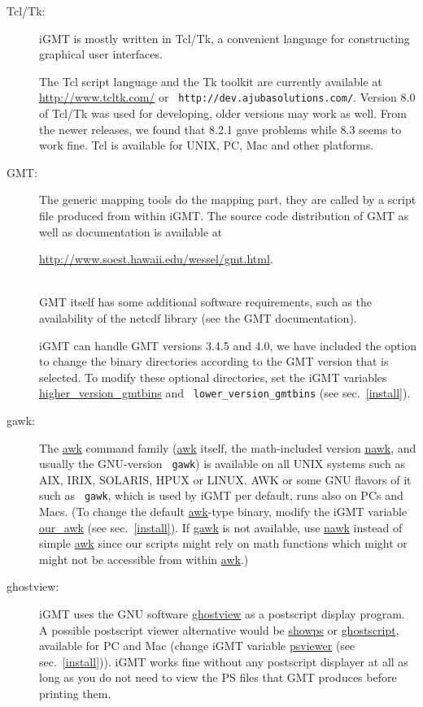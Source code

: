 \documentclass[11pt]{article}
\begin{document}
\begin{description}

\item[Tcl/Tk:] iGMT is mostly written in Tcl/Tk, a
  convenient language for constructing graphical user interfaces.
  
  The Tcl script language and the Tk toolkit \citep{ousterhout} are
  currently available at
  \url{http://www.tcltk.com/} or {\tt
    http://dev.ajubasolutions.com/}. Version 8.0 of Tcl/Tk was used for
  developing, older versions may work as well. From the newer releases,
  we found that 8.2.1 gave problems while 8.3 seems to work fine.
  Tcl is available for UNIX, PC, Mac and other platforms.

\item[GMT:] The generic mapping tools \citep{gmt,wessel95,wessel98} do the
  mapping part, they are called by a script file produced from within iGMT. 
  The source code distribution of GMT as well as documentation
  is available at\\
  \centerline{\url{http://www.soest.hawaii.edu/wessel/gmt.html}.}\\
  GMT itself has
  some additional software requirements, such as the availability of the netcdf library
  (see the GMT documentation). 

  
  iGMT can handle GMT versions 3.4.5 and 4.0, we have included the
  option to change the binary directories according to the GMT version
  that is selected. To modify these optional directories, set the iGMT
  variables \url{higher_version_gmtbins} and {\tt
    lower\_version\_gmtbins} (see sec.~\ref{install}).

  
  
\item[gawk:] The \url{awk} command family (\url{awk} itself, the
  math-included version \url{nawk}, and usually the GNU-version {\tt
    gawk}) is available on all UNIX systems such as AIX, IRIX,
  SOLARIS, HPUX or LINUX. AWK or some GNU flavors of it such as {\tt
    gawk}, which is used by iGMT per default,  runs also on PCs and
  Macs. (To change the default \url{awk}-type binary, modify the iGMT
  variable \url{our_awk} (see sec.~\ref{install}).  If \url{gawk} is
  not available, use
  \url{nawk} instead of simple \url{awk} since our scripts might
  rely on math functions which might or might not be accessible from
  within \url{awk}.)
 

  
\item[ghostview:] iGMT uses the GNU software \url{ghostview} as a
  postscript display program.  A possible postscript viewer
  alternative would be \url{showps} or \url{ghostscript}, available
  for PC and Mac (change iGMT variable \url{psviewer} (see
  sec.~\ref{install})).  iGMT works fine without any postscript
  displayer at all as long as you do not need to view the PS files
  that GMT produces before printing them.


\end{description}
\end{document}

